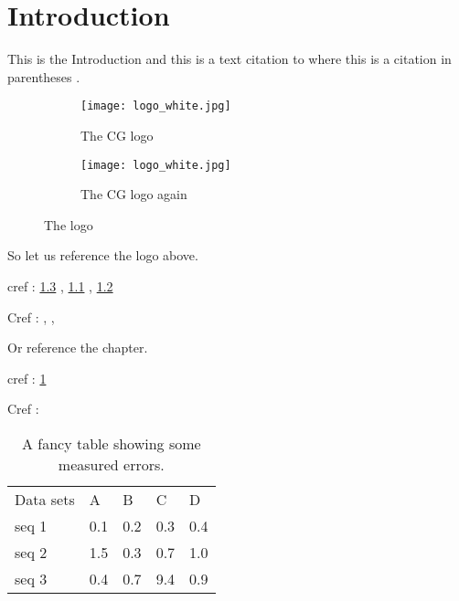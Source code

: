 
\chapter{Introduction}
\label{chap:introduction}

This is the Introduction and this is a text citation to \textcite{bestpaper} where this is a citation in parentheses \parencite{bestpaper}.

\begin{figure}[!ht]
    \centering
    \begin{subfigure}[t]{0.485\textwidth}
        \centering
        \texttt{[image: logo\_white.jpg]}
        \caption{The CG logo}
        \label{fig:logo_sub_1}
    \end{subfigure}
    \begin{subfigure}[t]{0.485\textwidth}
        \centering
        \texttt{[image: logo\_white.jpg]}
        \caption{The CG logo again}
        \label{fig:logo_sub_2}
    \end{subfigure}
    \caption{The logo}
    \label{fig:logo}
\end{figure}

So let us reference the logo above.

cref : \cref{fig:logo} , \cref{fig:logo_sub_1} , \cref{fig:logo_sub_2}

Cref :  ,  , 


\blankline
Or reference the chapter.

cref : \cref{chap:introduction}

Cref : 


\lipsum[1]

\begin{table*}[!htb]
    
    \centering
    \caption{A fancy table showing some measured errors.}
    \label{tab:benchmark}
    \begin{tabular}{ L{0.2\textwidth}R{0.15\textwidth}R{0.15\textwidth}R{0.15\textwidth}R{0.15\textwidth}}
    	\toprule
    	Data sets                                    &   A &   B &   C &   D \\
    	\addlinespace
        \midrule
        seq 1                                        & 0.1 & 0.2 & 0.3 & 0.4 \\
    	seq 2                                        & 1.5 & 0.3 & 0.7 & 1.0 \\
    	seq 3                                        & 0.4 & 0.7 & 9.4 & 0.9 \\ \bottomrule
    \end{tabular}
\end{table*}

\lipsum[2]

